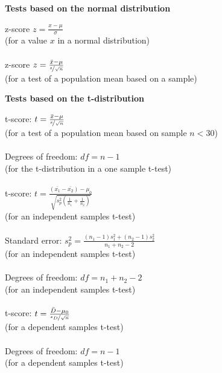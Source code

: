\hfill\vline\hfill
\begin{minipage}[t]{.45\textwidth}
\begin{center}
    \textbf{Tests based on the normal distribution}
\end{center}
\hline
\answerskip
z-score \hfill $z = \frac{x - \mu}{\sigma}$\\
{\scriptsize (for a value $x$ in a normal distribution)} \\
\\
z-score \hfill $z = \frac{\bar{x} - \mu}{\nicefrac{s}{\sqrt{n}}}$\\
{\scriptsize (for a test of a population mean based on a sample)} \\
\begin{center}
    \textbf{Tests based on the t-distribution}
\end{center}
\hline
\answerskip
t-score: \hfill $t = \frac{\bar{x} - \mu}{\nicefrac{s}{\sqrt{n}}}$\\
{\scriptsize (for a test of a population mean based on sample $n < 30$)} \\
\\
Degrees of freedom: \hfill $df = n - 1$\\
{\scriptsize (for the t-distribution in a one sample t-test)} \\
\\
t-score: \hfill $t = \frac{(\bar{x_1} - \bar{x_2}) - \mu_0}
{\sqrt{s^2_p (\frac{1}{n_1} + \frac{1}{n_2})}}$\\
{\scriptsize (for an independent samples t-test)} \\
\\
Standard error: \hfill $s^2_p = \frac{(n_1 - 1) s^2_1 + (n_2 - 1) s^2_2}{n_1 + n_2 - 2}$\\
{\scriptsize (for an independent samples t-test)} \\
\\
Degrees of freedom: \hfill $df = n_1 + n_2 - 2$\\
{\scriptsize (for an independent samples t-test)} \\
\\
t-score: \hfill $t = \frac{\bar{D} - \mu_0}
{\nicefrac{s_D}{\sqrt{n}}}$\\
{\scriptsize (for a dependent samples t-test)} \\
\\
Degrees of freedom: \hfill $df =n - 1$\\
{\scriptsize (for a dependent samples t-test)} \\
\\

\end{minipage}
